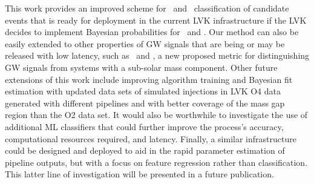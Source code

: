 This work provides an improved scheme for \hasns\ and \hasrem\ classification of candidate events that is ready for deployment in the current \ac{LVK} infrastructure if the \ac{LVK}
decides to implement Bayesian probabilities for \hasns\ and \hasrem. Our method can also be easily extended to other properties of \ac{GW} signals that are being or may be released
with low latency, such as \hasgap\ and \hasssm, a new proposed metric for distinguishing \ac{GW} signals from systems with a sub-solar mass component. Other future extensions of
this work include improving algorithm training and Bayesian fit estimation with updated data sets of simulated injections in \ac{LVK} \ac{O4} data generated with different pipelines
and with better coverage of the mass gap region than the \ac{O2} data set. It would also be worthwhile to investigate the use of additional ML classifiers that could further improve
the process's accuracy, computational resources required, and latency. Finally, a similar infrastructure could be designed and deployed to aid in the rapid parameter estimation of
pipeline outputs, but with a focus on feature regression rather than classification. This latter line of investigation will be presented in a future publication.





